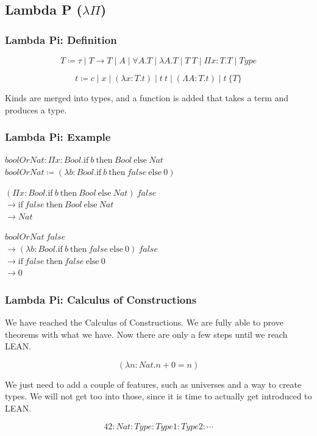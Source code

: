 \documentclass{beamer}
\newcommand{\ha}[3]{\text{if}\ #1\ \text{then}\ #2\ \text{else}\ #3}
\begin{document}
\subsection{Lambda P ($\lambda \Pi$)}

\begin{frame}
  \frametitle{Lambda Pi: Definition}

  $$
    T \coloneqq \tau
      \mid T \rightarrow T
      \mid A
      \mid \forall A . T
      \mid \lambda A . T
      \mid T\ T
      \mid \Pi x : T . T
      \mid Type
  $$

  $$
    t \coloneqq c
      \mid x
      \mid (\lambda x : T . t)
      \mid t\ t
      \mid (\Lambda A : T . t)
      \mid t\ \{T\}
  $$

  \vspace{5mm}

  Kinds are merged into types, and a function is added that takes a term and produces a type.

\end{frame}

\begin{frame}
  \frametitle{Lambda Pi: Example}
  $boolOrNat : \Pi x : Bool . \ha{b}{Bool}{Nat}$ \\
  $boolOrNat \coloneqq (\lambda b : Bool . \ha{b}{false}{0})$

  \vspace{1cm}

  $(\Pi x : Bool . \ha{b}{Bool}{Nat})\ false$ \\
  $\rightarrow \ha{false}{Bool}{Nat}$\\
  $\rightarrow Nat$

  \vspace{5mm}

  $boolOrNat\ false$\\
  $\rightarrow (\lambda b : Bool . \ha{b}{false}{0})\ false$\\
  $\rightarrow \ha{false}{false}{0}$\\
  $\rightarrow 0$\\

\end{frame}

\begin{frame}
  \frametitle{Lambda Pi: Calculus of Constructions}

  We have reached the Calculus of Constructions. We are fully able to prove theorems with what we have. Now there are only a few steps until we reach LEAN.

  \vspace{5mm}

  $$(\lambda n : Nat . n + 0 = n)$$

  \vspace{5mm}

  We just need to add a couple of features, such as universes and a way to create types. We will not get too into those, since it is time to actually get introduced to LEAN.

  $$42 : Nat : Type : Type 1 : Type 2 : \cdots$$

\end{frame}
\end{document}
